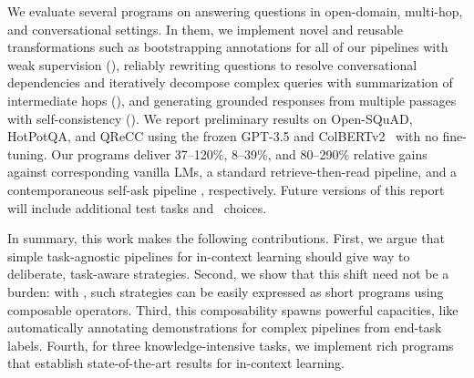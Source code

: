 We evaluate several \DSP programs on answering questions in open-domain, multi-hop, and conversational settings. In them, we implement novel and reusable transformations such as bootstrapping annotations for all of our pipelines with weak supervision (), reliably rewriting questions to resolve conversational dependencies and iteratively decompose complex queries with summarization of intermediate hops (), and generating grounded responses from multiple passages with self-consistency (). We report preliminary results on Open-SQuAD, HotPotQA, and QReCC using the frozen \LM{} GPT-3.5 and \RM{} ColBERTv2~\cite{khattab2020colbert,santhanam-etal-2022-colbertv2} with no fine-tuning. Our \DSP programs deliver 37--120\%, 8--39\%, and 80--290\% relative gains against corresponding vanilla LMs, a standard retrieve-then-read pipeline, and a contemporaneous self-ask pipeline \citep{press2022measuring}, respectively.
Future versions of this report will include additional test tasks and \LM\ choices.



In summary, this work makes the following contributions. First, we argue that simple task-agnostic pipelines for in-context learning should give way to deliberate, task-aware strategies. Second, we show that this shift need not be a burden: with \DSP, such strategies can be easily expressed as short programs using composable operators. Third, this composability spawns powerful capacities, like automatically annotating demonstrations for complex pipelines from end-task labels. Fourth, for three knowledge-intensive tasks, we implement rich programs that establish state-of-the-art results for in-context learning.




























  









